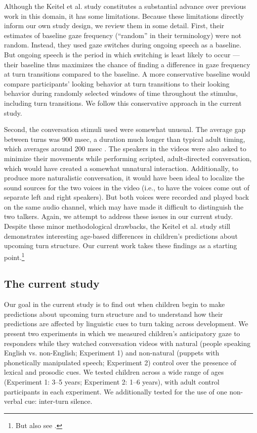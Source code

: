 \documentclass[authoryear, 12pt]{elsarticle}
\begin{document}
Although the Keitel et al. \citeyearpar{keitel2013} study constitutes a substantial advance over previous work in this domain, it has some limitations. Because these limitations directly inform our own study design, we review them in some detail. First, their estimates of baseline gaze frequency (``random'' in their terminology) were not random. Instead, they used gaze switches during ongoing speech as a baseline. But ongoing speech is the period in which switching is least likely to occur \citep{hirvenkari2013}---their baseline thus maximizes the chance of finding a difference in gaze frequency at turn transitions compared to the baseline. A more conservative baseline would compare participants' looking behavior at turn transitions to their looking behavior during randomly selected windows of time throughout the stimulus, including turn transitions. We follow this conservative approach in the current study.

Second, the conversation stimuli \citet{keitel2013} used were somewhat unusual. The average gap between turns was 900 msec, a duration much longer than typical adult timing, which averages around 200 msec \citep{stivers2009}. The speakers in the videos were also asked to minimize their movements while performing scripted, adult-directed conversation, which would have created a somewhat unnatural interaction. Additionally, to produce more naturalistic conversation, it would have been ideal to localize the sound sources for the two voices in the video (i.e., to have the voices come out of separate left and right speakers). But both voices were recorded and played back on the same audio channel, which may have made it difficult to distinguish the two talkers. Again, we attempt to address these issues in our current study. Despite these minor methodological drawbacks, the Keitel et al. \citeyearpar{keitel2013} study still demonstrates interesting age-based differences in children's predictions about upcoming turn structure. Our current work takes these findings as a starting point.\footnote{But also see \citet{casillas2012, casillas2013}.}


\subsection*{The current study}

Our goal in the current study is to find out when children begin to make predictions about upcoming turn structure and to understand how their predictions are affected by linguistic cues to turn taking across development. We present two experiments in which we measured children's anticipatory gaze to responders while they watched conversation videos with natural (people speaking English vs. non-English; Experiment 1) and non-natural (puppets with phonetically manipulated speech; Experiment 2) control over the presence of lexical and prosodic cues. We tested children across a wide range of ages (Experiment 1: 3--5 years; Experiment 2: 1--6 years), with adult control participants in each experiment. We additionally tested for the use of one non-verbal cue: inter-turn silence.
\end{document}
